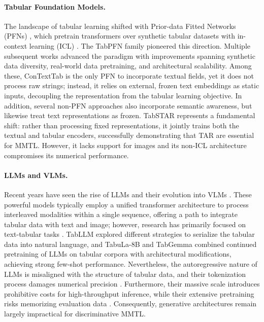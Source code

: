 \documentclass{article}
\begin{document}
\paragraph{Tabular Foundation Models.} The landscape of tabular learning shifted with Prior-data Fitted Networks (PFNs) \cite{muller_transformers_2021}, which pretrain transformers over synthetic tabular datasets with in-context learning (ICL) \cite{brown_language_2020}. The TabPFN family \cite{hollmann_tabpfn_2022, hollmann_accurate_2025, grinsztajn_tabpfn-25_2026, garg_real-tabpfn_2025} pioneered this direction. Multiple subsequent works \cite{qu_tabicl_2025, qu_tabiclv2_2026, ma_tabdpt_2025, zhang_mitra_2025, spinaci_contexttab_2025, zhang_limix_2025, bouadi_orion-msp_2025} advanced the paradigm with improvements spanning synthetic data diversity, real-world data pretraining, and architectural scalability. Among these, ConTextTab \cite{spinaci_contexttab_2025} is the only PFN to incorporate textual fields, yet it does not process raw strings; instead, it relies on external, frozen text embeddings as static inputs, decoupling the representation from the tabular learning objective. In addition, several non-PFN approaches \cite{yan_making_2023, kim_carte_2024, kim_table_2025} also incorporate semantic awareness, but likewise treat text representations as frozen. TabSTAR \cite{arazi_tabstar_2025} represents a fundamental shift: rather than processing fixed representations, it jointly trains both the textual and tabular encoders, successfully demonstrating that TAR are essential for MMTL. However, it lacks support for images and its non-ICL architecture compromises its numerical performance.


\paragraph{LLMs and VLMs.} Recent years have seen the rise of LLMs and their evolution into VLMs \cite{wu_multimodal_2023, yin_survey_2024, caffagni_revolution_2024}. These powerful models \cite{singh_openai_2025, comanici_gemini_2025} typically employ a unified transformer architecture \cite{vaswani_attention_2017} to process interleaved modalities within a single sequence, offering a path to integrate tabular data with text and image; however, research has primarily focused on text-tabular tasks \cite{fang_large_2024}. TabLLM \cite{hegselmann_tabllm_2023} explored different strategies to serialize the tabular data into natural language, and TabuLa-8B \cite{gardner_large_2024} and TabGemma \cite{schindler_tabgemma_2025} combined continued pretraining of LLMs on tabular corpora \cite{eggert_tablib_2023} with architectural modifications, achieving strong few-shot performance. Nevertheless, the autoregressive nature of LLMs is misaligned with the structure of tabular data, and their tokenization process damages numerical precision \cite{thawani_representing_2021, spathis_first_2024}. Furthermore, their massive scale introduces prohibitive costs for high-throughput inference, while their extensive pretraining risks memorizing evaluation data \cite{bordt_elephants_2024, gorla_illusion_2026}. Consequently, generative architectures remain largely impractical for discriminative MMTL.
\end{document}
